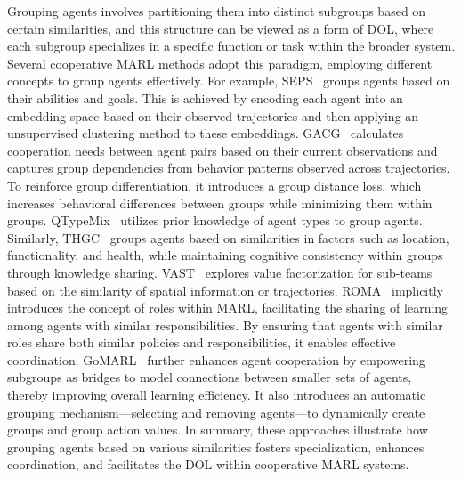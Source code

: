 Grouping agents involves partitioning them into distinct subgroups based on certain similarities, and this structure can be viewed as a form of DOL, where each subgroup specializes in a specific function or task within the broader system.
Several cooperative MARL methods adopt this paradigm, employing different concepts to group agents effectively.
For example, SEPS~\cite{christianos2021scaling} groups agents based on their abilities and goals. This is achieved by encoding each agent into an embedding space based on their observed trajectories and then applying an unsupervised clustering method to these embeddings.
GACG~\cite{duan2024group} calculates cooperation needs between agent pairs based on their current observations and captures group dependencies from behavior patterns observed across trajectories. To reinforce group differentiation, it introduces a group distance loss, which increases behavioral differences between groups while minimizing them within groups.
QTypeMix~\cite{fu2024qtypemix} utilizes prior knowledge of agent types to group agents.
Similarly, THGC~\cite{jiang2021multi} groups agents based on similarities in factors such as location, functionality, and health, while maintaining cognitive consistency within groups through knowledge sharing.
VAST~\cite{phan2021vast} explores value factorization for sub-teams based on the similarity of spatial information or trajectories.
ROMA~\cite{wang2020roma} implicitly introduces the concept of roles within MARL, facilitating the sharing of learning among agents with similar responsibilities. By ensuring that agents with similar roles share both similar policies and responsibilities, it enables effective coordination.
GoMARL~\cite{zang2024automatic} further enhances agent cooperation by empowering subgroups as bridges to model connections between smaller sets of agents, thereby improving overall learning efficiency. It also introduces an automatic grouping mechanism—selecting and removing agents—to dynamically create groups and group action values.
In summary, these approaches illustrate how grouping agents based on various similarities fosters specialization, enhances coordination, and facilitates the DOL within cooperative MARL systems.

